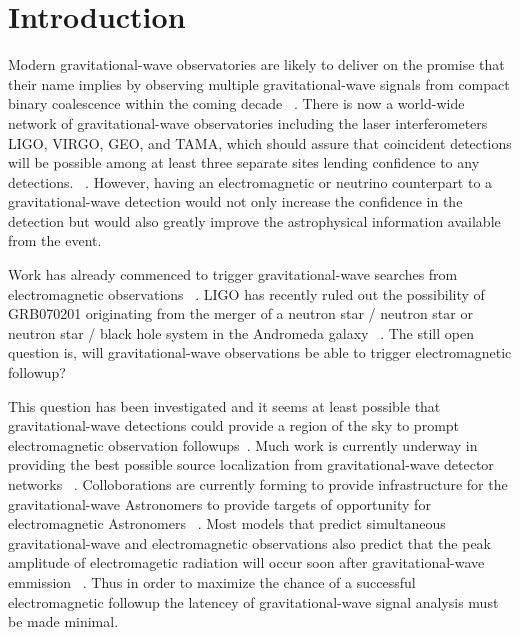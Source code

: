 \section{Introduction}
\label{sec:introduction}
Modern gravitational-wave observatories are likely to deliver on the promise 
that their name implies by observing multiple gravitational-wave signals from
compact binary coalescence within the coming decade ~\cite{kopparapu2008}. 
There is now a world-wide network of gravitational-wave observatories 
including the laser interferometers
LIGO, VIRGO, GEO, and TAMA, which should assure that coincident detections 
will be possible among at least three separate sites lending confidence
to any detections.
~\cite{Abbott:2005qm, beauville2008, beauville2006, blackburn2005, LIGOS1instpaper}.  
However, having an electromagnetic or neutrino counterpart to a 
gravitational-wave detection would not only increase the confidence in 
the detection but would also greatly improve the astrophysical information
available from the event.

Work has already commenced to trigger gravitational-wave searches from 
electromagnetic observations ~\cite{triggeredsearches2008}. LIGO has recently
ruled out the possibility of GRB070201 originating from the merger of a
neutron star / neutron star or neutron star / black hole system in the
Andromeda galaxy ~\cite{GRB070201}.  The still open question is, will 
gravitational-wave observations be able to trigger electromagnetic followup?


This question has been investigated and it seems  at least
possible that gravitational-wave detections could provide a region of the
sky to prompt electromagnetic observation followups~\cite{sylvestre2003}.
Much work is currently underway in providing the best possible source 
localization from gravitational-wave detector networks
~\cite{markowitz2008, raymond2008, cavalier2006}.  Colloborations are
currently forming to provide infrastructure for the gravitational-wave
Astronomers to provide targets of opportunity for electromagnetic 
Astronomers ~\cite{kanner2008}.  Most models that predict simultaneous
gravitational-wave and electromagnetic observations also predict that the
peak amplitude of electromagetic radiation will occur soon after 
gravitational-wave emmission ~\cite{sylvestre2003}.  Thus in order to maximize
the chance of a successful electromagnetic followup the latencey of 
gravitational-wave signal analysis must be made minimal.

